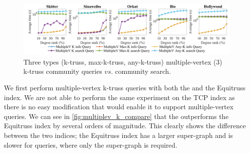 \begin{figure}
    \centering
    \includegraphics[width=0.9\linewidth, trim={0cm 0cm, 0cm, 0.2cm}, clip]{./figures/multiplev_3_info_query_small.jpg}
    \caption{Three types (k-truss, max-k-truss, any-k-truss) multiple-vertex ($3$) \toplevelprob{} k-truss community queries $vs.$ community search.}
    \label{fig:multiplev_3_info_query}
		\vspace{-0.5cm}
\end{figure}



We first perform \toplevelprob{} multiple-vertex k-truss queries with both the \twolevelindex{} and the Equitruss index. We are not able to perform the same experiment on the TCP index as there is no easy modification that would enable it to support multiple-vertex queries. We can see in \autoref{fig:multiplev_k_compare} that the \twolevelindex{} outperforms the Equitruss index by several orders of magnitude. This clearly shows the difference between the two indices; the Equitruss index has a larger super-graph and is slower for \toplevelprob{} queries, where only the super-graph is required. %

